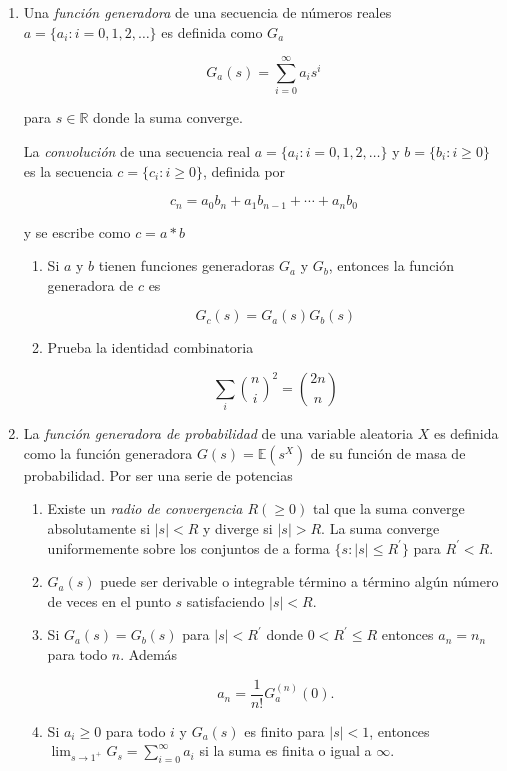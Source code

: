 \documentclass[a4paper,11pt]{report}
\begin{document}
\begin{enumerate}
\item Una \textit{funci\'on generadora} de una secuencia de n\'umeros reales $a = \{ a_i: i = 0, 1, 2, \dots\}$ es definida como $G_a$

\[
G_a(s) = \sum_{i = 0}^{\infty}a_is^i
\]

para $s \in \mathbb{R}$ donde la suma converge.


\vspace{0.3cm}

La \textit{convoluci\'on} de una secuencia real $a = \{ a_i: i = 0, 1, 2, \dots\}$ y $b = \{b_i: i \geq 0 \}$ es la secuencia $c = \{c_i: i \geq 0  \}$, definida por

\[
c_n = a_0b_n + a_1b_{n -1} + \cdots + a_nb_{0}
\]

y se escribe como $c = a* b$

\begin{enumerate}
	\item Si $a$ y $b$ tienen funciones generadoras $G_a$ y $G_b$, entonces la funci\'on generadora de $c$ es
	
	\[
	G_{c}(s) = G_{a}(s)G_{b}(s)
	\]
	
	\item Prueba la identidad combinatoria 
	
	\[
	\sum_{i}\binom{n}{i}^2 = \binom{2n}{n}
	\]
\end{enumerate}

\item La \textit{funci\'on generadora de probabilidad}  de una variable aleatoria $X$ es definida como la funci\'on generadora $G(s) = \mathbb{E}(s^X)$ de su funci\'on de masa de probabilidad. Por ser una serie de potencias

\begin{enumerate}
	\item Existe un \textit{radio de convergencia $R (\geq 0)$} tal que la suma converge absolutamente si $\vert s \vert  < R$ y diverge si $\vert s \vert > R$. La suma converge uniformemente  sobre los conjuntos  de a forma $\{s: \vert s \vert \leq R^{'} \}$ para $R^{'} < R$.
	\item $G_a(s)$ puede ser derivable o integrable t\'ermino a t\'ermino alg\'un n\'umero de veces en el punto $s$ satisfaciendo $\vert s \vert  < R$.
	\item Si $G_a(s) = G_b(s)$  para $\vert s \vert  < R^{'}$ donde $0  < R^{'} \leq R$ entonces $a_n = n_n$ para todo $n$. Adem\'as 
	
	\[
	a_n = \frac{1}{n!}G_{a}^{(n)}(0).
	\]
\item Si $a_i \geq 0$ para todo $i$ y $G_{a}(s)$ es finito para $\vert s \vert < 1$, entonces $\lim_{s \rightarrow 1^{+}}G_{s} = \sum_{i = 0}^{\infty}a_i$ si la suma es finita o igual a $\infty$.


\end{enumerate}
\end{enumerate}
\end{document}
